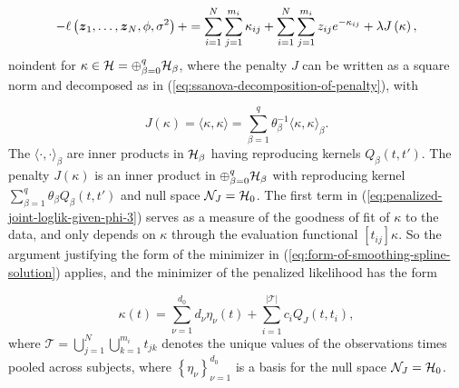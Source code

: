 \begin{equation} \label{eq:penalized-joint-loglik-given-phi-3}
-\ell\left( \mbox{\boldmath $z$}_1,\dots, \mbox{\boldmath $z$}_N, \phi, \sigma^2 \right) + =  \sum_{i = 1}^N \sum_{j = 1}^{m_i} \kappa_{ij}  + \sum_{i = 1}^N \sum_{j = 1}^{m_i} z_{ij} e^{-\kappa_{ij}} + \lambda J\left(\kappa\right),  
\end{equation}
noindent
for $\kappa \in \mathcal{H} = \oplus_{\beta = 0}^q \mathcal{H}_\beta$, where the penalty $J$ can be written as a square norm and decomposed as in (\ref{eq:ssanova-decomposition-of-penalty}), with

\begin{equation*} 
J\left(\kappa \right) = \langle \kappa, \kappa \rangle = \sum_{\beta = 1}^q \theta_\beta^{-1}\langle \kappa, \kappa \rangle_{\beta}.
\end{equation*}
\noindent 
The $\langle \cdot, \cdot \rangle_{\beta}$ are inner products in $\mathcal{H}_\beta$ having reproducing kernels $Q_\beta\left(t,t'\right)$. The penalty $J\left(\kappa\right)$ is an inner product in $\oplus_{\beta = 0}^q \mathcal{H}_\beta$ with reproducing kernel $\sum_{\beta=1}^q \theta_\beta Q_\beta\left(t, t'\right)$ and null space $\mathcal{N}_J = \mathcal{H}_0$. The first term in (\ref{eq:penalized-joint-loglik-given-phi-3}) serves as a measure of the goodness of fit of $\kappa$ to the data, and only depends on $\kappa$ through the evaluation functional $\left[t_{ij}\right]\kappa$. So the argument justifying the form of the minimizer in (\ref{eq:form-of-smoothing-spline-solution}) applies, and the minimizer of the penalized likelihood has the form 

\begin{equation} \label{eq:form-of-smoothing-spline-solution-kappa}
\kappa\left( t \right) = \sum_{\nu = 1}^{d_0} d_\nu\eta_\nu\left( t \right) + \sum_{i = 1}^{\vert \mathcal{T} \vert} c_i Q_J\left( t, t_i \right),
\end{equation}  
\noindent
where $\mathcal{T} = \bigcup_{j=1}^N\bigcup_{k=1}^{m_i} t_{jk}$ denotes the unique values of the observations times pooled across subjects, where $\left\{\eta_\nu \right\}_{\nu=1}^{d_0}$ is a basis for the null space $\mathcal{N}_J = \mathcal{H}_0$. 